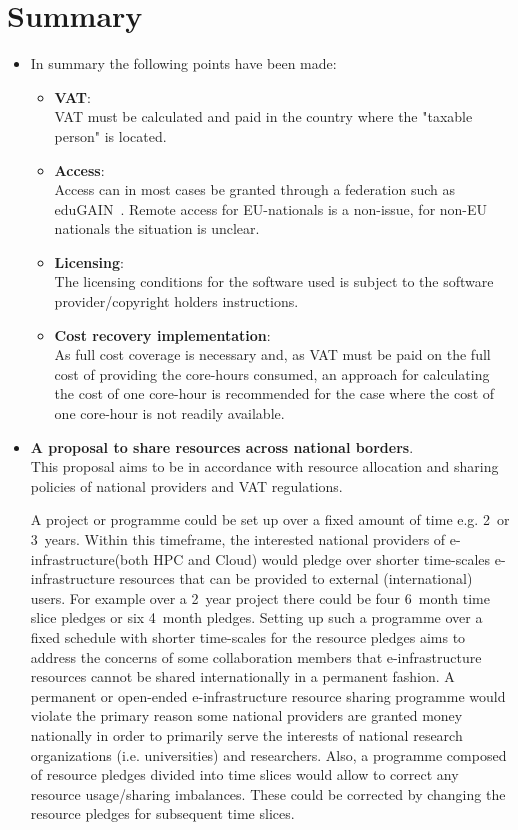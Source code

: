 \documentclass{article}
\newcommand{\einfra}{e-infrastructure\xspace}
\newcommand{\np}{national provider\xspace}
\newcommand{\nps}{\np{s}\xspace}
\begin{document}
\section{Summary} 
\label{sec-summary}
\begin{itemize}
    \item []
In summary the following points have been made:

\begin{itemize}
    \item []\textbf{VAT}: \\VAT must be calculated and paid in the country where the "taxable person" is located. 
    \item []\textbf{Access}: \\ Access can in most cases be granted through a federation such as eduGAIN~\cite{edugain}. Remote access for EU-nationals is a non-issue, for non-EU nationals the situation is unclear. 
    \item []\textbf{Licensing}: \\The licensing conditions for the software used is subject to the software provider/copyright holders instructions. 
    \item []\textbf{Cost recovery implementation}:\\ As full cost coverage is necessary and, as VAT must be paid on the full cost of providing the core-hours consumed, an approach for calculating the cost of one core-hour is recommended for the case where the cost of one core-hour is not readily available. 
\end{itemize}

\item [] {\bf A proposal to share resources across national borders}. \\
This proposal aims to be in accordance with resource allocation and sharing policies of \nps and VAT regulations. 

A project or programme could be set up over a fixed amount of time e.g. 2~or 3~years.
Within this timeframe, the interested \nps of \einfra (both HPC and Cloud) would pledge over shorter time-scales \einfra resources that can be provided to external (international) users.
For example over a 2~year project there could be four 6~month time slice pledges or six 4~month pledges.
Setting up such a programme over a fixed schedule with shorter time-scales for the resource pledges aims to address the concerns of some collaboration members that \einfra resources cannot be shared internationally in a permanent fashion.
A permanent or open-ended \einfra resource sharing programme would violate the primary reason some \nps are granted money nationally in order to primarily serve the interests of national research organizations (i.e. universities) and researchers.
Also, a programme composed of resource pledges divided into time slices would allow to correct any resource usage/sharing imbalances.
These could be corrected by changing the resource pledges for subsequent time slices.


\end{itemize}
\end{document}
